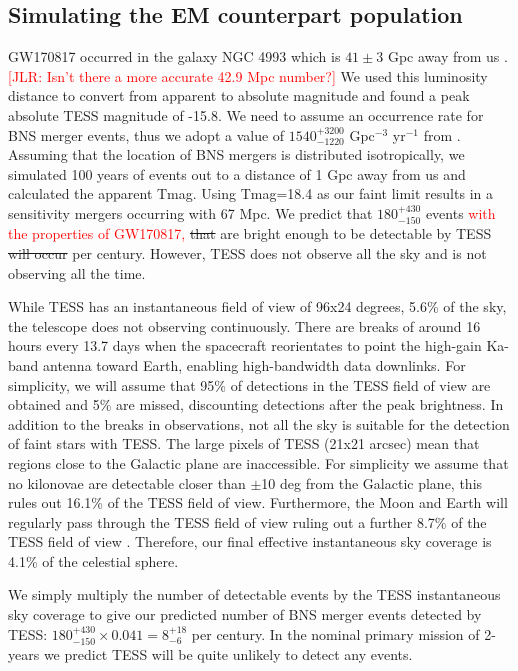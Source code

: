 \documentclass[modern]{aastex61}
\newcommand{\red}[1]{\textcolor{red}{#1}}
\begin{document}
\subsection{Simulating the EM counterpart population}
GW170817 occurred in the galaxy NGC 4993 which is $41\pm3$ Gpc away from us \citep{}. \red{[JLR: Isn't there a more accurate 42.9 Mpc number?]} We used this luminosity distance to convert from apparent to absolute magnitude and found a peak absolute TESS magnitude of -15.8. We need to assume an occurrence rate for BNS merger events, thus we adopt a value of $1540^{+3200}_{-1220}$ Gpc$^{-3}$ yr$^{-1}$ from \citet{Abbott2017a}. Assuming that the location of BNS mergers is distributed isotropically, we simulated 100 years of events out to a distance of 1 Gpc away from us and calculated the apparent Tmag. Using Tmag=18.4 as our faint limit results in a sensitivity mergers occurring with 67 Mpc. We predict that $180^{+430}_{-150}$ events \red{with the properties of GW170817,} \sout{that} are bright enough to be detectable by TESS \sout{will occur} per century. However, TESS does not observe all the sky and is not observing all the time. 

While TESS has an instantaneous field of view of 96x24 degrees, 5.6\% of the sky, the telescope does not observing continuously. There are breaks of around 16 hours every 13.7 days when the spacecraft reorientates to point the high-gain Ka-band antenna toward Earth, enabling high-bandwidth data downlinks. For simplicity, we will assume that 95\% of detections in the TESS field of view are obtained and 5\% are missed, discounting detections after the peak brightness. In addition to the breaks in observations, not all the sky is suitable for the detection of faint stars with TESS. The large pixels of TESS (21x21 arcsec) mean that regions close to the Galactic plane are inaccessible. For simplicity we assume that no kilonovae are detectable closer than $\pm$10 deg from the Galactic plane, this rules out 16.1\% of the TESS field of view. Furthermore, the Moon and Earth will regularly pass through the TESS field of view ruling out a further 8.7\% of the TESS field of view \citep{Bouma2017}. Therefore, our final effective instantaneous sky coverage is 4.1\% of the celestial sphere.

We simply multiply the number of detectable events by the TESS instantaneous sky coverage to give our predicted number of BNS merger events detected by TESS: $180^{+430}_{-150} \times 0.041=8^{+18}_{-6}$ per century. In the nominal primary mission of 2-years we predict TESS will be quite unlikely to detect any events.
\end{document}
